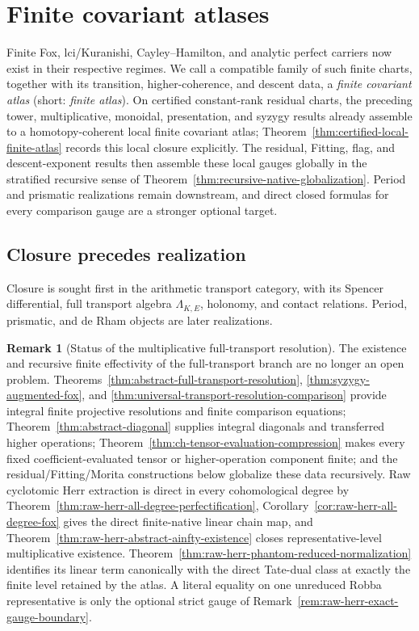 \documentclass[11pt]{article}
\theoremstyle{definition}
\newtheorem{remark}[theorem]{Remark}
\begin{document}
\section{Finite covariant atlases}

Finite Fox, lci/Kuranishi, Cayley--Hamilton, and analytic perfect carriers now exist in their respective regimes.  We call a compatible family of such finite charts, together with its transition, higher-coherence, and descent data, a \emph{finite covariant atlas} (short: \emph{finite atlas}).  On certified constant-rank residual charts, the preceding tower, multiplicative, monoidal, presentation, and syzygy results already assemble to a homotopy-coherent local finite covariant atlas; Theorem~\ref{thm:certified-local-finite-atlas} records this local closure explicitly.  The residual, Fitting, flag, and descent-exponent results then assemble these local gauges globally in the stratified recursive sense of Theorem~\ref{thm:recursive-native-globalization}.  Period and prismatic realizations remain downstream, and direct closed formulas for every comparison gauge are a stronger optional target.

\subsection{Closure precedes realization}

Closure is sought first in the arithmetic transport category, with its Spencer differential, full transport algebra $\Lambda_{K,E}$, holonomy, and contact relations.  Period, prismatic, and de Rham objects are later realizations.

\begin{remark}[Status of the multiplicative full-transport resolution]\label{rem:transport-resolution-status}
The existence and recursive finite effectivity of the full-transport branch are no longer an open problem.  Theorems~\ref{thm:abstract-full-transport-resolution}, \ref{thm:syzygy-augmented-fox}, and \ref{thm:universal-transport-resolution-comparison} provide integral finite projective resolutions and finite comparison equations; Theorem~\ref{thm:abstract-diagonal} supplies integral diagonals and transferred higher operations; Theorem~\ref{thm:ch-tensor-evaluation-compression} makes every fixed coefficient-evaluated tensor or higher-operation component finite; and the residual/Fitting/Morita constructions below globalize these data recursively.  Raw cyclotomic Herr extraction is direct in every cohomological degree by Theorem~\ref{thm:raw-herr-all-degree-perfectification}, Corollary~\ref{cor:raw-herr-all-degree-fox} gives the direct finite-native linear chain map, and Theorem~\ref{thm:raw-herr-abstract-ainfty-existence} closes representative-level multiplicative existence.  Theorem~\ref{thm:raw-herr-phantom-reduced-normalization} identifies its linear term canonically with the direct Tate-dual class at exactly the finite level retained by the atlas.  A literal equality on one unreduced Robba representative is only the optional strict gauge of Remark~\ref{rem:raw-herr-exact-gauge-boundary}.
\end{remark}
\end{document}
